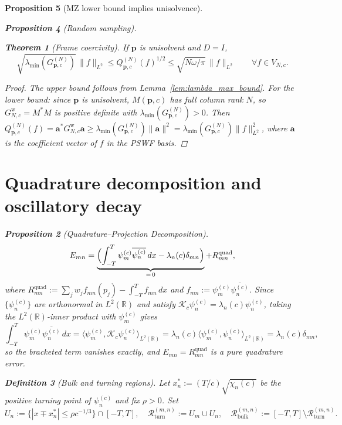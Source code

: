 \documentclass[12pt,a4paper]{amsart}
\newtheorem{theorem}{Theorem}[section]
\newtheorem{proposition}[theorem]{Proposition}
\theoremstyle{definition}
\newtheorem{definition}[theorem]{Definition}
\newcommand{\Kop}{\mathcal{K}_c}
\newcommand{\GVM}{G^{(N)}_{\mathbf{p},c}}
\newcommand{\QM}{Q^{(N)}_{\mathbf{p},c}}
\newcommand{\norm}[1]{\|#1\|}
\newcommand{\Rbulk}{\mathcal{R}_{\mathrm{bulk}}}
\newcommand{\Rturning}{\mathcal{R}_{\mathrm{turn}}}
\begin{document}
\begin{proposition}[MZ lower bound implies unisolvence]
\begin{proposition}[Random sampling]
\begin{theorem}[Frame coercivity]\label{thm:coercivity}
If $\mathbf{p}$ is unisolvent and $D=I$,
\[
  \sqrt{\lambda_{\min}(\GVM)}\,\norm{f}_{L^2}
  \le\QM(f)^{1/2}
  \le\sqrt{N\omega/\pi}\,\norm{f}_{L^2}
  \qquad\forall f\in V_{N,c}.
\]
\end{theorem}
\begin{proof}
The upper bound follows from Lemma~\ref{lem:lambda_max_bound}.
For the lower bound: since $\mathbf{p}$ is unisolvent,
$M(\mathbf{p},c)$ has full column rank $N$, so
$G^{\mathrm{w}}_{N,c}=M^*M$ is positive definite with
$\lambda_{\min}(\GVM)>0$. Then
$\QM(f)=\mathbf{a}^*G^{\mathrm{w}}_{N,c}\mathbf{a}
\ge\lambda_{\min}(\GVM)\norm{\mathbf{a}}^2
=\lambda_{\min}(\GVM)\norm{f}_{L^2}^2$,
where $\mathbf{a}$ is the coefficient vector of $f$ in the PSWF basis.
\end{proof}

\section{Quadrature decomposition and oscillatory decay}\label{sec:decay}

\begin{proposition}[Quadrature--Projection Decomposition]%
\label{prop:xry_split}
\[
  E_{mn}
  =\underbrace{\Bigl(
     \int_{-T}^{T}\psi_m^{(c)}\overline{\psi_n^{(c)}}\,dx
     -\lambda_n(c)\delta_{mn}\Bigr)}_{=\,0}
   +R_{mn}^{\mathrm{quad}},
\]
where $R_{mn}^{\mathrm{quad}}:=\sum_j w_j f_{mn}(p_j)
-\int_{-T}^T f_{mn}\,dx$ and
$f_{mn}:=\psi_m^{(c)}\overline{\psi_n^{(c)}}$.
Since $\{\psi_n^{(c)}\}$ are orthonormal in $L^2(\mathbb{R})$ and
satisfy $\Kop\psi_n^{(c)}=\lambda_n(c)\psi_n^{(c)}$, taking the
$L^2(\mathbb{R})$-inner product with $\psi_m^{(c)}$ gives
\[
  \int_{-T}^{T}\psi_m^{(c)}\overline{\psi_n^{(c)}}\,dx
  =\langle\psi_m^{(c)},\Kop\psi_n^{(c)}\rangle_{L^2(\mathbb{R})}
  =\lambda_n(c)\langle\psi_m^{(c)},\psi_n^{(c)}\rangle_{L^2(\mathbb{R})}
  =\lambda_n(c)\delta_{mn},
\]
so the bracketed term vanishes exactly, and
$E_{mn}=R_{mn}^{\mathrm{quad}}$ is a pure quadrature error.
\end{proposition}

\begin{definition}[Bulk and turning regions]\label{def:bulk}
Let $x_n^*:=(T/c)\sqrt{\chi_n(c)}$ be the positive turning point of
$\psi_n^{(c)}$ and fix $\rho>0$. Set
\[
  U_n:=\{|x\mp x_n^*|\le\rho c^{-1/3}\}\cap[-T,T],
  \quad
  \Rturning^{(m,n)}:=U_m\cup U_n,
  \quad
  \Rbulk^{(m,n)}:=[-T,T]\setminus\Rturning^{(m,n)}.
\]
\end{definition}


\end{proposition}
\end{proposition}
\end{document}
